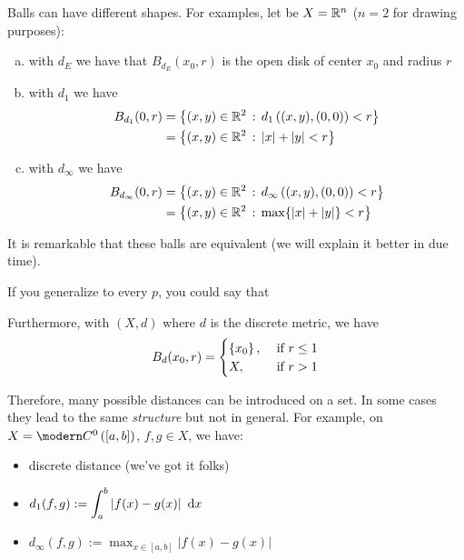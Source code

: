 Balls can have different shapes. For examples, let be $X=\mathbb{R}^n$ ($n=2$ for drawing purposes):
\begin{enumerate}[(a)]
    \item with $d_E$ we have that $B_{d_E}(x_0,r)$ is the open disk of center $x_0$ and radius $r$
    \item with $d_1$ we have
    \begin{align*}
        B_{d_1}(0,r)&=\left\{ (x,y)\in\mathbb{R}^2\,:\,d_1\left( (x,y),(0,0) \right)<r \right\} \\
        &=\left\{ (x,y)\in\mathbb{R}^2\,:\,|x|+|y|<r \right\}
    \end{align*}
    \item with $d_\infty$ we have
    \begin{align*}
        B_{d_\infty}(0,r)&=\left\{ (x,y)\in\mathbb{R}^2\,:\,d_\infty\left( (x,y),(0,0) \right)<r \right\} \\
        &=\left\{ (x,y)\in\mathbb{R}^2\,:\,\max\{|x|+|y|\}<r \right\}
    \end{align*}
    \begin{figure}[H]
    \centering
     \quad
     \quad
\end{figure}
\end{enumerate}

It is remarkable that these balls are equivalent (we will explain it better in due time). 

\newpage

If you generalize to every $p$, you could say that

Furthermore, with $(X,d)$ where $d$ is the discrete metric, we have
\begin{equation*}
B_d(x_0,r)=\begin{cases}
    \left\{ x_0 \right\}, &\text{ if }r\leq 1 \\
    X,&\text{ if }r>1    
\end{cases}
\end{equation*}

Therefore, many possible distances can be introduced on a set. In some cases they lead to the same \emph{structure} but not in general. For example, on $X=\Cc^0\left( [a,b] \right)$, $f,g\in X$, we have:
\begin{itemize}
    \item discrete distance (we've got it folks)
    \item $\displaystyle d_1(f,g):=\int_a^b\left| f(x)-g(x) \right|\  \mathrm{d} x$
    \item $\displaystyle d_\infty(f,g):=\max_{x\in[a,b]}\left| f(x)-g(x) \right|$
\end{itemize}

